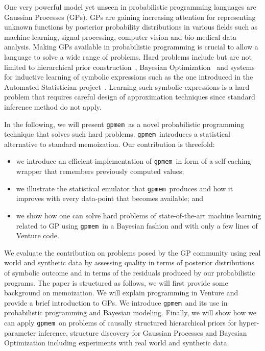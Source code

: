 \documentclass{article} %
\newcommand{\gpmem}{\texttt{gpmem}}
\begin{document}
One very powerful model yet unseen in probabilistic programming languages are Gaussian Processes (GPs). GPs are gaining increasing attention for representing unknown functions by posterior probability distributions in various fields such as machine learning, signal processing, computer vision and bio-medical data analysis. Making GPs available in probabilistic programming is crucial to allow a language to solve a wide range of problems. Hard problems include but are not limited to hierarchical prior construction~\citep{neal1997monte}, Bayesian Optimization~\cite{snoek2012practical} and systems for inductive learning of symbolic expressions such as the one introduced in the Automated Statistician project~\cite{duvenaud2013structure,lloyd2014automatic}. Learning such symbolic expressions is a hard problem that requires careful design of approximation techniques since standard inference method do not apply.

In the following, we will present \gpmem\ as a novel probabilistic programming technique that solves such hard problems. \gpmem\ introduces a statistical alternative to standard memoization.  Our contribution is threefold: 
\begin{itemize}
\item we introduce an efficient implementation of \gpmem\ in form of a self-caching wrapper  that remembers previously computed values;
\item we illustrate the statistical emulator that \gpmem\ produces and how it improves with every data-point that becomes available; and
 \item  we show how one can solve hard problems  of state-of-the-art machine learning related to GP  using \gpmem\ in a Bayesian fashion and with only a few lines of Venture code.
\end{itemize}

We evaluate the contribution on problems posed by the GP community using real world and synthetic data by assessing quality in terms of posterior distributions of symbolic outcome and in terms of the residuals produced by our probabilistic programs. 
The paper is structured as follows, we will first provide some background on memoization. We will explain programming in Venture and provide a brief introduction to GPs. We introduce \gpmem\ and its use in probabilistic programming and Bayesian modeling. Finally, we will show how we can apply \gpmem\ on problems of causally structured hierarchical priors for hyper-parameter inference, structure discovery for Gaussian Processes and Bayesian Optimization including experiments with real world and synthetic data.
\end{document}
